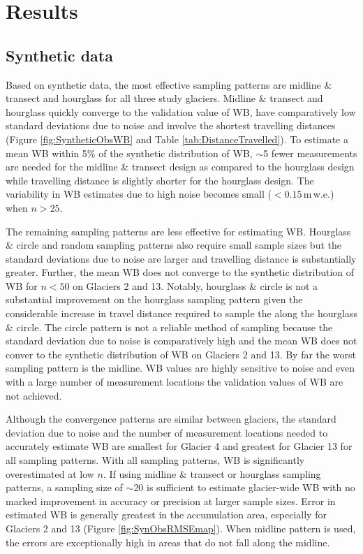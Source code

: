 \documentclass[twocolumn,letterpaper]{igs}
\begin{document}
\section{Results }

\subsection{Synthetic data}

Based on synthetic data, the most effective sampling patterns are midline \& transect and hourglass for all three study glaciers. Midline \& transect and hourglass quickly converge to the validation value of WB, have comparatively low standard deviations due to noise and involve the shortest travelling distances (Figure \ref{fig:SyntheticObsWB} and Table \ref{tab:DistanceTravelled}). To estimate a mean WB within 5\% of the synthetic distribution of WB, $\sim$5 fewer measurements are needed for the midline \& transect design as compared to the hourglass design while travelling distance is slightly shorter for the hourglass design. The variability in WB estimates due to high noise becomes small ($<0.15$\,m\,w.e.) when $n>25$.

The remaining sampling patterns are less effective for estimating WB. Hourglass \& circle and random sampling patterns also require small sample sizes but the standard deviations due to noise are larger and travelling distance is substantially greater. Further, the mean WB does not converge to the synthetic distribution of WB for $n<50$ on Glaciers 2 and 13. Notably, hourglass \& circle is not a substantial improvement on the hourglass sampling pattern given the considerable increase in travel distance required to sample the along the hourglass \& circle. The circle pattern is not a reliable method of sampling because the standard deviation due to noise is comparatively high and the mean WB does not conver to the synthetic distribution of WB on Glaciers 2 and 13. By far the worst sampling pattern is the midline. WB values are highly sensitive to noise and even with a large number of measurement locations the validation values of WB are not achieved. 

Although the convergence patterns are similar between glaciers, the standard deviation due to noise and the number of measurement locations needed to accurately estimate WB are smallest for Glacier 4 and greatest for Glacier 13 for all sampling patterns. With all sampling patterns, WB is significantly overestimated at low $n$. If using midline \& transect or hourglass sampling patterns, a sampling size of $\sim$20 is sufficient to estimate glacier-wide WB with no marked improvement in accuracy or precision at larger sample sizes. 
Error in estimated WB is generally greatest in the accumulation area, especially for Glaciers 2 and 13 (Figure \ref{fig:SynObsRMSEmap}). When midline pattern is used, the errors are exceptionally high in areas that do not fall along the midline.
\end{document}
